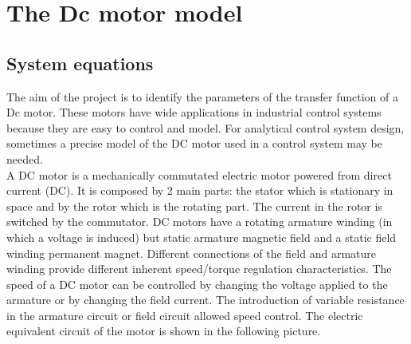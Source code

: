 \chapter{The Dc motor model}
\label{chap:Descrizione}
\section{System equations}
The aim of the project is to identify the parameters of the transfer function of a Dc motor.
These motors have wide applications in industrial control systems because they are easy to control and model. For analytical control system design, sometimes a precise model of the DC motor used in a control system may be needed.
\\
A DC motor is a mechanically commutated electric motor powered from direct current (DC). It is composed by 2 main parts: the stator which is stationary in space and by the rotor which is the rotating part. The current in the rotor is switched by the commutator.
DC motors have a rotating armature winding (in which a voltage is induced) but static armature magnetic field and a static field winding permanent magnet. Different connections of the field and armature winding provide different inherent speed/torque regulation characteristics. The speed of a DC motor can be controlled by changing the voltage applied to the armature or by changing the field current. The introduction of variable resistance in the armature circuit or field circuit allowed speed control. 
The electric equivalent circuit of the motor is shown in the following picture.
%
%
